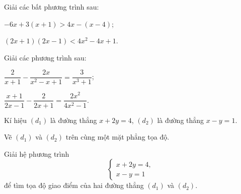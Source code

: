 \begin{exercises}
\begin{questions}[series=SGK]
        \begin{center}
        \end{center}

        \answerline
        \answerline

        \item Giải các bất phương trình sau:
        \begin{questions}
            \item $-6x+3(x+1)>4x-(x-4)$;
            \answerline
            \item $(2x+1)(2x-1)<4x^2-4x+1$.
            \answerline
        \end{questions}

        \item Giải các phương trình sau:
        \begin{questions}
            \item $\dfrac{2}{x+1}-\dfrac{2x}{x^2-x+1}=\dfrac{3}{x^3+1}$;
            \answerline
            \answerline
            \item $\dfrac{x+1}{2x-1}-\dfrac{2}{2x+1}=\dfrac{2x^2}{4x^2-1}$.
            \answerline
            \answerline
        \end{questions}

        \item Kí hiệu $(d_1)$ là đường thẳng $x+2y=4$, $(d_2)$ là đường thẳng $x-y=1$.
        \begin{questions}
            \item Vẽ $(d_1)$ và $(d_2)$ trên cùng một mặt phẳng tọa độ.
            \answerline
            \answerline
            \item Giải hệ phương trình
            \[
                \begin{cases}
                    x+2y=4,\\
                    x-y=1
                \end{cases}
            \]
            để tìm tọa độ giao điểm của hai đường thẳng $(d_1)$ và $(d_2)$.
            \answerline
        \end{questions}


\end{questions}
\end{exercises}
